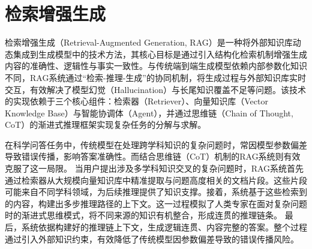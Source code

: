 \section{检索增强生成}
检索增强生成（Retrieval-Augmented Generation, RAG）\cite{karpukhinDensePassageRetrieval2020,izacardFewshotLearningRetrieval2022,yaoEditingLargeLanguage2023,fengTrendsIntegrationKnowledge2023,xuRetrievalMeetsLong2024,balaguerRAGVsFinetuning2024}是一种将外部知识库动态集成到生成模型中的技术方法，其核心目标是通过引入结构化检索机制增强生成内容的准确性、逻辑性与事实一致性。与传统端到端生成模型依赖内部参数化知识不同，RAG系统通过“检索-推理-生成”的协同机制，将生成过程与外部知识库实时交互，有效解决了模型幻觉（Hallucination）与长尾知识覆盖不足等问题。该技术的实现依赖于三个核心组件：检索器（Retriever）、向量知识库（Vector Knowledge Base）与智能协调体（Agent），并通过思维链（Chain of Thought, CoT）的渐进式推理框架实现复杂任务的分解与求解。

在科学问答任务中，传统模型在处理跨学科知识的复杂问题时，常因模型参数偏差导致错误传播，影响答案准确性。而结合思维链（CoT）机制的RAG系统则有效克服了这一局限。
当用户提出涉及多学科知识交叉的复杂问题时，RAG系统首先通过检索器从大规模向量知识库中精准提取与问题高度相关的文档片段。这些片段可能来自不同学科领域，为后续推理提供了知识支撑。接着，系统基于这些检索到的内容，构建出多步推理路径的上下文。这一过程模拟了人类专家在面对复杂问题时的渐进式思维模式，将不同来源的知识有机整合，形成连贯的推理链条。
最后，系统依据构建好的推理链上下文，生成逻辑连贯、内容完整的答案。整个过程通过引入外部知识约束，有效降低了传统模型因参数偏差导致的错误传播风险。

